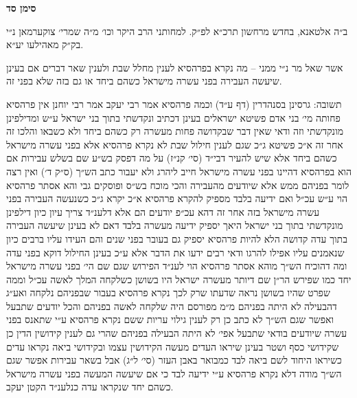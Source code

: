 \documentclass[12pt, openany]{book}
\newcommand{\chapname}{}
\newcommand{\newchap}[1]{
	\addcontentsline{toc}{chapter}{#1}
	\renewcommand{\chapname}{#1}
		\begin{center}
			\textbf{%
\fontsize{16pt}{16pt}\selectfont
				#1}
		\end{center}
}
\begin{document}
\newchap{סימן סד}
\begin{multicols}{2}
ב״ה אלטאנא, בחדש מרחשון תרכ״א לפ״ק. למחותני הרב היקר וכו׳ מ״ה שמרי׳ צוקערמאן נ״י בק״ק מאהילעו יע״א.\\\vspace{0pt}

אשר שאל מר נ״י ממני – מה נקרא בפרהסיא לענין מחלל שבת ולענין שאר דברים אם בעינן שיעשה העבירה בפני עשרה מישראל כשהם ביחד או גם בזה שלא בפני זה.\\\vspace{0pt}

תשובה: גרסינן בסנהדרין (דף ע״ד) וכמה פרהסיא אמר רבי יעקב אמר רבי יוחנן אין פרהסיא פחותה מי׳ בני אדם פשיטא ישראלים בעינן דכתיב ונקדשתי בתוך בני ישראל ע״ש ומדילפינן מונקדשתי וזה ודאי שאין דבר שבקדושה פחות מעשרה רק כשהם ביחד ולא כשבאו והלכו זה אחר זה א״כ פשיטא ג״כ שגם לענין חילול שבת לא נקרא פרהסיא אלא בפני עשרה מישראל כשהם ביחד אלא שיש להעיר דבי״ד (סי׳ קנ״ז) על מה דפסק בש״ע שם בשלש עבירות אם הוא בפרהסיא דהיינו בפני עשרה מישראל חייב ליהרג ולא יעבור כתב הש״ך (ס״ק ד׳) ואין רצה לומר בפניהם ממש אלא שיודעים מהעבירה והכי מוכח בש״ס ופוסקים גבי והא אסתר פרהסיא הוי ע״ש עכ״ל ואם ידיעה בלבד מספיק להקרא פרהסיא א״כ יקרא ג״כ כשנעשה העבירה בפני עשרה מישראל בזה אחר זה דהא עכ״פ יודעים הם אלא דלענ״ד צריך עיון כיון דילפינן מונקדשתי בתוך בני ישראל היאך יספיק ידיעה מעשרה בלבד דאם לא בעינן שיעשה העבירה בתוך עדה קדושה הלא להיות פרהסיא יספיק גם בעובר בפני שנים והם העידו עליו ברבים כיון שנאמנים עליו אפילו להרגו ודאי רבים ידעו את הדבר אלא ע״כ בעינן החילול דוקא בפני עדה ומה דהוכיח הש״ך מוהא אסתר פרהסיא הוי לענ״ד הפירוש שגם שם הי׳ בפני עשרה מישראל יחד כמו שפירש הר״ן שם דיותר מעשרה ישראל היו בשושן כשלקחה המלך לאשה עכ״ל וממה שפרט שהיו בשושן נראה שדעתו שרק לכך נקרא פרהסיא בעבור שבפניהם נלקחה ואע״ג דהבעילה לא היתה בפניהם מ״מ מפורסם היה שלקחה לאשה בפניהם והכל יודעים שתבעל ואפשר שגם הש״ך לא כתב כן רק לענין גילוי עריות ששם נקרא פרהסיא ע״י שתאנס בפני עשרה שיודעים בודאי שתבעל אפי׳ לא היתה הבעילה בפניהם שהרי גם לענין קידושין הדין כן שקידושי כסף ושטר בעינן שיראו העדים מעשה הקידושין עצמו ובקידושי ביאה נקראו עדים כשיראו היחוד לשם ביאה לבד כמבואר באבן העזר (סי׳ ל״ג) אבל בשאר עבירות אפשר שגם הש״ך מודה דלא נקרא פרהסיא ע״י ידיעה לבד כי אם שיעשה המעשה בפני עשרה מישראל כשהם יחד שנקראו עדה כנלענ״ד הקטן יעקב.\\\vspace{0pt}

\end{multicols}\newpage
\end{document}
